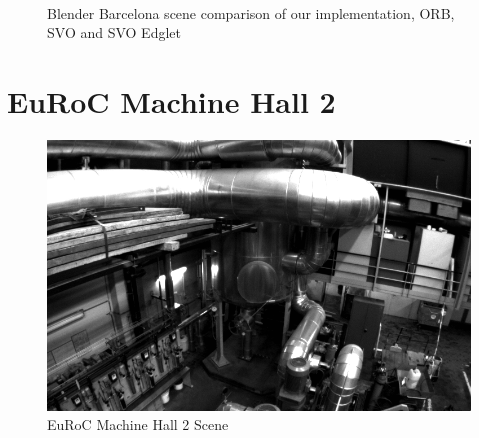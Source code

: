 \documentclass[11pt,a4paper,titlepage,oneside]{report}
\begin{document}
\begin{figure}[H]
	\centering
	\\
	\caption{Blender Barcelona scene comparison of our implementation, ORB, SVO and SVO Edglet}\label{fig:blender_barcelona_comp}
\end{figure}

\section{EuRoC Machine Hall 2}

\begin{figure}[H]
  \includegraphics[width=1.0\textwidth]{img/euroc_scene.png}
  \caption{EuRoC Machine Hall 2 Scene}\label{fig:euroc_scene}
\end{figure}
\end{document}
